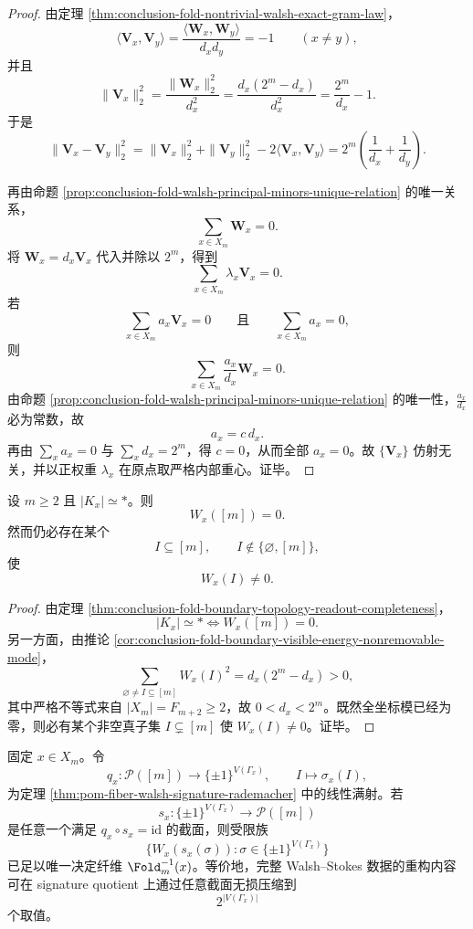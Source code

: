 \begin{proof}
由定理 \ref{thm:conclusion-fold-nontrivial-walsh-exact-gram-law}，
\[
\langle \mathbf V_x,\mathbf V_y\rangle
=
\frac{\langle \mathbf W_x,\mathbf W_y\rangle}{d_xd_y}
=
-1
\qquad(x\neq y),
\]
并且
\[
\|\mathbf V_x\|_2^2
=
\frac{\|\mathbf W_x\|_2^2}{d_x^2}
=
\frac{d_x(2^m-d_x)}{d_x^2}
=
\frac{2^m}{d_x}-1.
\]
于是
\[
\|\mathbf V_x-\mathbf V_y\|_2^2
=
\|\mathbf V_x\|_2^2+\|\mathbf V_y\|_2^2-2\langle \mathbf V_x,\mathbf V_y\rangle
=
2^m\left(\frac{1}{d_x}+\frac{1}{d_y}\right).
\]

再由命题 \ref{prop:conclusion-fold-walsh-principal-minors-unique-relation} 的唯一关系，
\[
\sum_{x\in X_m}\mathbf W_x=0.
\]
将 \(\mathbf W_x=d_x\mathbf V_x\) 代入并除以 \(2^m\)，得到
\[
\sum_{x\in X_m}\lambda_x\mathbf V_x=0.
\]
若
\[
\sum_{x\in X_m}a_x\mathbf V_x=0
\qquad\text{且}\qquad
\sum_{x\in X_m}a_x=0,
\]
则
\[
\sum_{x\in X_m}\frac{a_x}{d_x}\mathbf W_x=0.
\]
由命题 \ref{prop:conclusion-fold-walsh-principal-minors-unique-relation} 的唯一性，\(\frac{a_x}{d_x}\) 必为常数，故
\[
a_x=c\,d_x.
\]
再由 \(\sum_x a_x=0\) 与 \(\sum_x d_x=2^m\)，得 \(c=0\)，从而全部 \(a_x=0\)。故 \(\{\mathbf V_x\}\) 仿射无关，并以正权重 \(\lambda_x\) 在原点取严格内部重心。证毕。
\end{proof}

\begin{corollary}[可缩性仅湮灭全奇偶模而不湮灭整个边界谱]\label{cor:conclusion-fold-contractibility-kills-only-total-parity-mode}
设 \(m\ge 2\) 且 \(|K_x|\simeq *\)。则
\[
W_x([m])=0.
\]
然而仍必存在某个
\[
I\subseteq[m],
\qquad
I\notin\{\varnothing,[m]\},
\]
使
\[
W_x(I)\neq 0.
\]
\end{corollary}

\begin{proof}
由定理 \ref{thm:conclusion-fold-boundary-topology-readout-completeness}，
\[
|K_x|\simeq *
\iff
W_x([m])=0.
\]
另一方面，由推论 \ref{cor:conclusion-fold-boundary-visible-energy-nonremovable-mode}，
\[
\sum_{\varnothing\neq I\subseteq[m]}W_x(I)^2=d_x(2^m-d_x)>0,
\]
其中严格不等式来自 \(|X_m|=F_{m+2}\ge 2\)，故 \(0<d_x<2^m\)。既然全坐标模已经为零，则必有某个非空真子集 \(I\subsetneq[m]\) 使 \(W_x(I)\neq 0\)。证毕。
\end{proof}

\begin{conjecture}\label{conj:conclusion-fold-signature-section-sufficiency}
固定 \(x\in X_m\)。令
\[
q_x:\mathcal P([m])\to\{\pm 1\}^{V(\Gamma_x)},
\qquad
I\mapsto \sigma_x(I),
\]
为定理 \ref{thm:pom-fiber-walsh-signature-rademacher} 中的线性满射。若
\[
s_x:\{\pm 1\}^{V(\Gamma_x)}\to\mathcal P([m])
\]
是任意一个满足 \(q_x\circ s_x=\mathrm{id}\) 的截面，则受限族
\[
\bigl\{W_x(s_x(\sigma)):\sigma\in\{\pm 1\}^{V(\Gamma_x)}\bigr\}
\]
已足以唯一决定纤维 \(\Fold_m^{-1}(x)\)。等价地，完整 Walsh--Stokes 数据的重构内容可在 signature quotient 上通过任意截面无损压缩到
\[
2^{|V(\Gamma_x)|}
\]
个取值。
\end{conjecture}

